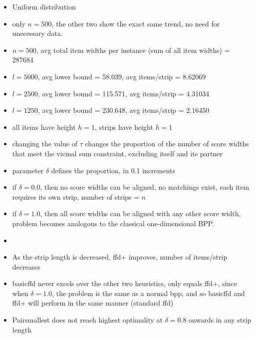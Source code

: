 \documentclass[oribibl]{llncs}
\begin{document}
\begin{itemize}
	\item Uniform distribution
	\item only $n = 500$, the other two show the exact same trend, no need for unecessary data. 
	\item $n = 500$, avg total item widths per instance (sum of all item widths) = 287684
	\item $l = 5000$, avg lower bound = 58.039, avg items/strip = 8.62069
	\item $l = 2500$, avg lower bound = 115.571, avg items/strip = 4.31034
	\item $l = 1250$, avg lower bound = 230.648, avg items/strip = 2.16450
	\item all items have height $h = 1$, strips have height $h = 1$
	\item changing the value of $\tau$ changes the proportion of the number of score widths that meet the vicinal sum constraint, excluding itself and its partner
	\item parameter $\delta$ defines the proportion, in 0.1 increments
	\item if $\delta = 0.0$, then no score widths can be aligned, no matchings exist, each item requires its own strip, number of strips = $n$
	\item if $\delta = 1.0$, then all score widths can be aligned with any other score width, problem becomes analogous to the classical one-dimensional BPP.
	\item \cite{lewis2011}
	\item As the strip length is decreased, ffd+ improves, number of items/strip decreases
	\item basicffd never excels over the other two heuristics, only equals ffd+, since when $\delta = 1.0$, the problem is the same as a normal bpp, and so basicffd and ffd+ will perform in the same manner (standard ffd)
	\item Pairsmallest does not reach highest optimality at $\delta = 0.8$ onwards in any strip length
\end{itemize}











\end{document}
